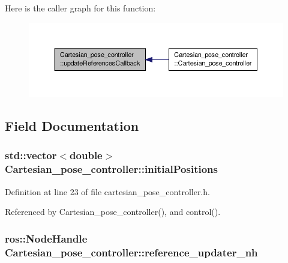 Here is the caller graph for this function\-:\nopagebreak
\begin{figure}[H]
\begin{center}
\leavevmode
\includegraphics[width=350pt]{classCartesian__pose__controller_af9c1ec1f565375f50f8a15b16464f94d_icgraph}
\end{center}
\end{figure}




\subsection{Field Documentation}
\hypertarget{classCartesian__pose__controller_a42433d7f2e4e03ccaac56e1f9a7a5027}{
\subsubsection[{initial\-Positions}]{\setlength{\rightskip}{0pt plus 5cm}std\-::vector$<$double$>$ Cartesian\-\_\-pose\-\_\-controller\-::initial\-Positions\hspace{0.3cm}{\ttfamily [private]}}}\label{classCartesian__pose__controller_a42433d7f2e4e03ccaac56e1f9a7a5027}


Definition at line 23 of file cartesian\-\_\-pose\-\_\-controller.\-h.



Referenced by Cartesian\-\_\-pose\-\_\-controller(), and control().

\hypertarget{classCartesian__pose__controller_ab2d5fe68c8229b6c90f84ac1601eb637}{
\subsubsection[{reference\-\_\-updater\-\_\-nh}]{\setlength{\rightskip}{0pt plus 5cm}ros\-::\-Node\-Handle Cartesian\-\_\-pose\-\_\-controller\-::reference\-\_\-updater\-\_\-nh\hspace{0.3cm}{\ttfamily [private]}}}\label{classCartesian__pose__controller_ab2d5fe68c8229b6c90f84ac1601eb637}


